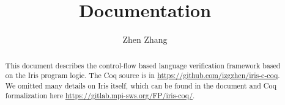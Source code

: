 \documentclass[10pt]{article}
\title{\bfseries \irisc{} Documentation}
\author{Zhen Zhang}
\begin{document}
\maketitle
\thispagestyle{empty}
\vfill
\begin{abstract}
  This document describes the control-flow based language verification framework based on the Iris program logic.
  The Coq source is in \url{https://github.com/izgzhen/iris-c-coq}.
  We omitted many details on Iris itself,
  which can be found in the document and Coq formalization here \url{https://gitlab.mpi-sws.org/FP/iris-coq/}.
\end{abstract}

\clearpage
\tableofcontents
\clearpage

\begingroup

\endgroup
\clearpage

\begingroup

\endgroup
\clearpage

\begingroup

\endgroup
\clearpage


\begingroup

\endgroup
\clearpage

\begingroup

\endgroup
\clearpage
\end{document}
